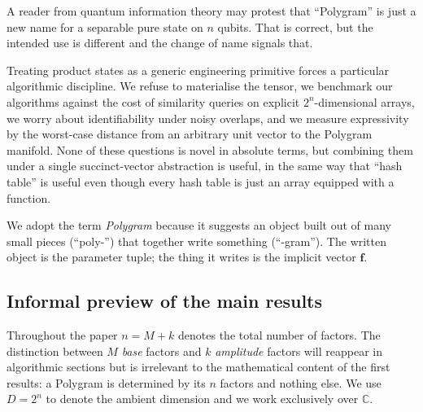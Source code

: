 \documentclass[11pt,letterpaper]{article}
\theoremstyle{definition}
\newcommand{\C}{\mathbb{C}}
\begin{document}
A reader from quantum information theory may protest that ``Polygram'' is just
a new name for a separable pure state on $n$ qubits. That is correct, but the
intended use is different and the change of name signals that.

Treating product states as a generic engineering primitive forces a particular
algorithmic discipline. We refuse to materialise the tensor, we benchmark our
algorithms against the cost of similarity queries on explicit
$2^{n}$-dimensional arrays, we worry about identifiability under noisy
overlaps, and we measure expressivity by the worst-case distance from an
arbitrary unit vector to the Polygram manifold. None of these questions is
novel in absolute terms, but combining them under a single succinct-vector
abstraction is useful, in the same way that ``hash table'' is useful even
though every hash table is just an array equipped with a function.

We adopt the term \emph{Polygram} because it suggests an object built out of
many small pieces (``poly-'') that together write something (``-gram''). The
written object is the parameter tuple; the thing it writes is the implicit
vector $\bm{f}$.

\subsection{Informal preview of the main results}

Throughout the paper $n = M + k$ denotes the total number of factors. The
distinction between $M$ \emph{base} factors and $k$ \emph{amplitude} factors
will reappear in algorithmic sections but is irrelevant to the mathematical
content of the first results: a Polygram is determined by its $n$ factors and
nothing else. We use $D = 2^{n}$ to denote the ambient dimension and we work
exclusively over $\C$.
\end{document}
